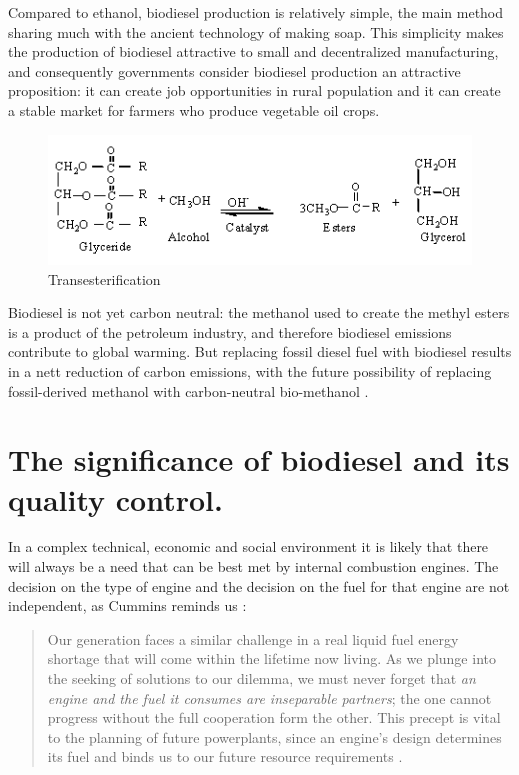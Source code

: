 Compared to ethanol, biodiesel production is relatively simple, the main method
sharing much with the ancient technology of making soap. This simplicity makes
the production of biodiesel attractive to small and decentralized manufacturing,
and consequently governments consider biodiesel production an attractive
proposition: it can create job opportunities in rural population and it can
create a stable market for farmers who produce vegetable oil crops.

\begin{figure}
	\centering
	\includegraphics[width=\textwidth]{Figures/reaction}
	\decoRule
	\caption[Transesterification]{Transesterification}
	\label{fig:Electron}
\end{figure}

Biodiesel is not yet carbon neutral: the methanol used to create the methyl
esters is a product of the petroleum industry, and therefore biodiesel emissions
contribute to global warming. But replacing fossil diesel fuel with biodiesel
results in a nett reduction of carbon emissions, with the future possibility of
replacing fossil-derived methanol with carbon-neutral bio-methanol
\autocite{Shamsul2014}.

\section{The significance of biodiesel and its quality control.}

In a complex technical, economic and social environment it is likely that there
will always be a need that can be best met by internal combustion engines. The
decision on the type of engine and the decision on the fuel for that engine are
not independent, as Cummins reminds us \autocite{Cummins1989}:

\begin{quotation}
Our generation faces a similar challenge in a real liquid fuel energy shortage
that will come within the lifetime now living. As we plunge into the seeking of
solutions to our dilemma, we must never forget that \textit{an engine and the
fuel it consumes are inseparable partners}; the one cannot progress without the
full cooperation form the other. This precept is vital to the planning of future
powerplants, since an engine's design determines its fuel and binds us to our
future resource requirements .
\end{quotation}

